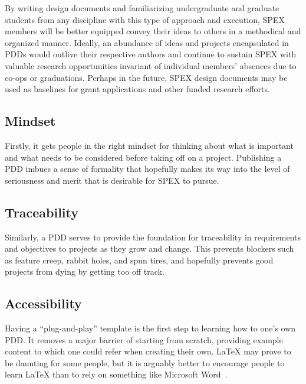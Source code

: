 \documentclass[conference]{IEEEtran} %
\begin{document}
By writing design documents and familiarizing undergraduate and graduate students from any discipline with this type of approach and execution, SPEX members will be better equipped convey their ideas to others in a methodical and organized manner.
Ideally, an abundance of ideas and projects encapsulated in PDDs would outlive their respective authors and continue to sustain SPEX with valuable research opportunities invariant of individual members' absences due to co-ops or graduations.
Perhaps in the future, SPEX design documents may be used as baselines for grant applications and other funded research efforts.



\subsection{Mindset}
\label{subsec:mindset}
Firstly, it gets people in the right mindset for thinking about what is important and what needs to be considered before taking off on a project.
Publishing a PDD imbues a sense of formality that hopefully makes its way into the level of seriousness and merit that is desirable for SPEX to pursue.

\subsection{Traceability}
\label{subsec:traceability}
Similarly, a PDD serves to provide the foundation for traceability in requirements and objectives to projects as they grow and change.
This prevents blockers such as feature creep, rabbit holes, and spun tires, and hopefully prevents good projects from dying by getting too off track.

\subsection{Accessibility}
\label{subsec:plug-n-play}

Having a ``plug-and-play'' template is the first step to learning how to one's own PDD\@.
It removes a major barrier of starting from scratch, providing example content to which one could refer when creating their own.
\LaTeX{} may prove to be daunting for some people, but it is arguably better to encourage people to learn LaTeX than to rely on something like Microsoft Word~\cite{lamp94}.
\end{document}
